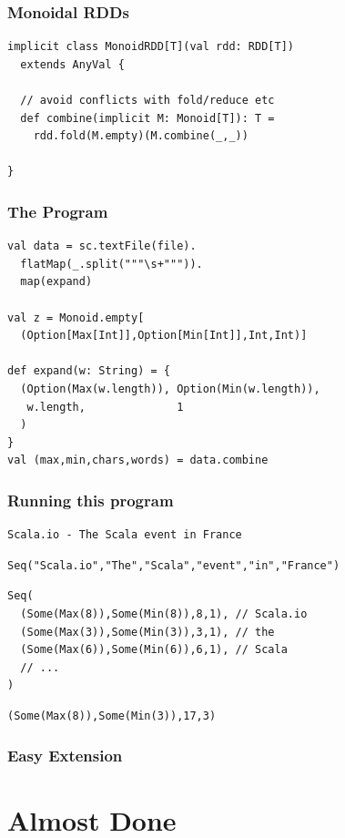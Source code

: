 \documentclass{beamer}
\begin{document}
\begin{frame}[fragile]
  \frametitle{Monoidal RDDs}
\begin{verbatim}
implicit class MonoidRDD[T](val rdd: RDD[T])
  extends AnyVal {

  // avoid conflicts with fold/reduce etc
  def combine(implicit M: Monoid[T]): T =
    rdd.fold(M.empty)(M.combine(_,_))

}
\end{verbatim}
\end{frame}

\begin{frame}
  \frametitle{The Program}
\begin{verbatim}
val data = sc.textFile(file).
  flatMap(_.split("""\s+""")).
  map(expand)

val z = Monoid.empty[
  (Option[Max[Int]],Option[Min[Int]],Int,Int)]

def expand(w: String) = {
  (Option(Max(w.length)), Option(Min(w.length)),
   w.length,              1
  )
}
val (max,min,chars,words) = data.combine
\end{verbatim}
\end{frame}

\begin{frame}[fragile]
  \frametitle{Running this program}
\begin{verbatim}
Scala.io - The Scala event in France
\end{verbatim}

\begin{verbatim}
Seq("Scala.io","The","Scala","event","in","France")
\end{verbatim}

\begin{verbatim}
Seq(
  (Some(Max(8)),Some(Min(8)),8,1), // Scala.io
  (Some(Max(3)),Some(Min(3)),3,1), // the
  (Some(Max(6)),Some(Min(6)),6,1), // Scala
  // ...
)
\end{verbatim}

\begin{verbatim}
(Some(Max(8)),Some(Min(3)),17,3)
\end{verbatim}

\end{frame}

\begin{frame}
  \frametitle{Easy Extension}

\end{frame}

\section{Almost Done}
\end{document}

